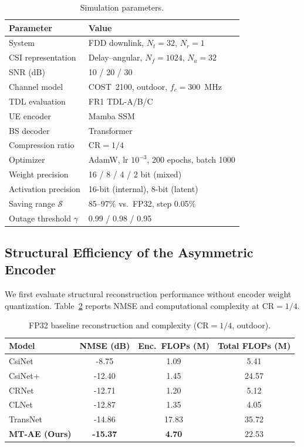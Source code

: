 \documentclass[conference]{IEEEtran}
\begin{document}
\begin{table}[t]
\centering
\caption{Simulation parameters.}
\label{tab:sim_setup}
\setlength{\tabcolsep}{5pt}
\begin{tabular}{ll}
\toprule
\textbf{Parameter} & \textbf{Value} \\
\midrule
System & FDD downlink, $N_t=32$, $N_r=1$ \\
CSI representation & Delay--angular, $N_f=1024$, $N_a=32$ \\
SNR (dB) & 10 / 20 / 30 \\
Channel model & COST~2100, outdoor, $f_c=300$~MHz \cite{COST2100} \\
TDL evaluation & FR1 TDL-A/B/C \cite{3GPP38901} \\
\midrule
UE encoder & Mamba SSM \cite{Mamba, VMamba} \\
BS decoder & Transformer \\
Compression ratio & $\mathrm{CR}=1/4$ \\
Optimizer & AdamW, lr $10^{-3}$, 200 epochs, batch 1000 \\
\midrule
Weight precision & 16 / 8 / 4 / 2 bit (mixed) \\
Activation precision & 16-bit (internal), 8-bit (latent) \\
Saving range $\mathcal{S}$ & 85--97\% vs.\ FP32, step 0.05\% \\
Outage threshold $\gamma$ & 0.99 / 0.98 / 0.95 \\
\bottomrule
\end{tabular}
\end{table}

\subsection{Structural Efficiency of the Asymmetric Encoder}
\label{subsec:struct_eff}
We first evaluate structural reconstruction performance without encoder weight quantization. Table~\ref{tab:struct_cr14_final} reports NMSE and computational complexity at $\mathrm{CR}=1/4$.

\begin{table}[t]
\centering
\caption{FP32 baseline reconstruction and complexity ($\mathrm{CR}=1/4$, outdoor).}
\label{tab:struct_cr14_final}
\setlength{\tabcolsep}{4pt}
\begin{tabular}{lccc}
\toprule
Model & NMSE (dB) & Enc.\ FLOPs (M) & Total FLOPs (M) \\
\midrule
CsiNet   & -8.75  &  1.09 &   5.41 \\
CsiNet+  & -12.40 &  1.45 &  24.57 \\
CRNet    & -12.71 &  1.20 &   5.12 \\
CLNet    & -12.87 &  1.35 &   4.05 \\
TransNet & -14.86 & 17.83 &  35.72 \\
\textbf{MT-AE (Ours)} & \textbf{-15.37} & \textbf{4.70} & 22.53 \\
\bottomrule
\end{tabular}
\end{table}
\end{document}

